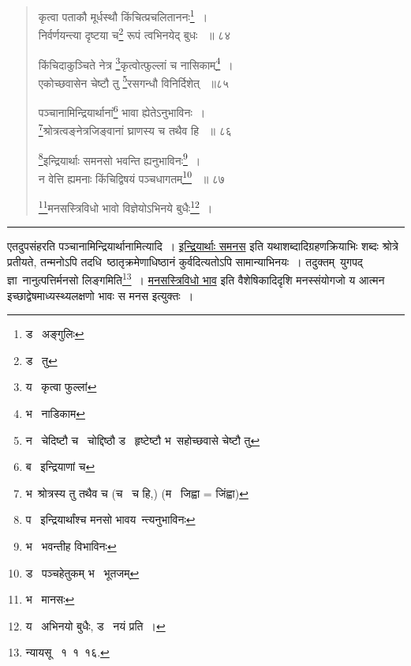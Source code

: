 \documentclass[11pt, openany]{book}
\begin{document}
{\begin{quote}
{कृत्वा पताकौ मूर्धस्थौ किंचित्प्रचलिताननः\renewcommand{\thefootnote}{2}\footnote{ड \textendash\ अङ्गुलिः}~।\\
निर्वर्णयन्त्या दृष्टया च\renewcommand{\thefootnote}{3}\footnote{ड \textendash\ तु } रूपं त्वभिनयेद् बुधः ~॥ ८४ 

किंचिदाकुञ्चिते नेत्र \renewcommand{\thefootnote}{4}\footnote{य \textendash\ कृत्वा फुल्लां}कृत्वोत्फुल्लां च नासिकाम्\renewcommand{\thefootnote}{5}\footnote{भ \textendash\ नाडिकाम }~। \\
एकोच्छवासेन चेष्टौ तु \renewcommand{\thefootnote}{6}\footnote{न \textendash\ चेदिष्टौ च \textendash\ चोद्दिष्ठौ ड \textendash\ हृष्टेष्टौ भ\textendash\ सहोच्छवासे चेष्टौ तु}रसगन्धौ विनिर्दिशेत् ~॥८५ 

पञ्चानामिन्द्रियार्थानां\renewcommand{\thefootnote}{7}\footnote{ब \textendash\ इन्द्रियाणां च} भावा ह्येतेऽनुभाविनः~।\\ 
\renewcommand{\thefootnote}{8}\footnote{भ\textendash\ श्रोत्रस्य तु तथैव च (च \textendash\ च हि,) (म \textendash\ जिह्वा = जिंह्वा) }श्रोत्रत्वङ्नेत्रजिङ्वानां घ्राणस्य च तथैव हि ~॥ ८६ 

\renewcommand{\thefootnote}{9}\footnote{प \textendash\ इन्द्रियार्थांश्च मनसो भावय\textendash\ न्त्यनुभाविनः }इन्द्रियार्थाः समनसो भवन्ति ह्यनुभाविनः\renewcommand{\thefootnote}{10}\footnote{भ \textendash\ भवन्तीह विभाविनः}~।\\ 
न वेत्ति ह्यमनाः किंचिद्विषयं पञ्चधागतम्\renewcommand{\thefootnote}{11}\footnote{ड \textendash\ पञ्चहेतुकम् भ \textendash\ भूतजम्} ~॥ ८७ 

\renewcommand{\thefootnote}{12}\footnote{भ \textendash\ मानसः }मनसस्त्रिविधो भावो विज्ञेयोऽभिनये बुधैः\renewcommand{\thefootnote}{13}\footnote{य \textendash\ अभिनयो बुधैः, ड \textendash\ नयं प्रति~। }~। }
\end{quote}

\hrule

\vspace{2mm}

\begin{sloppypar}
एतदुपसंहरति पञ्चानामिन्द्रियार्थानामित्यादि~। \underline{इन्द्रियार्थाः समनस} इति यथाशब्दादिग्रहणक्रियाभिः शब्दः श्रोत्रे प्रतीयते, तन्मनोऽपि तदधि\textendash\ ष्ठातृक्रमेणाधिष्ठानं कुर्वदित्यतोऽपि सामान्याभिनयः~। तदुक्तम्\textendash\ युगपद् ज्ञा\textendash\ नानुत्पत्तिर्मनसो लिङ्गमिति\renewcommand{\thefootnote}{*}\footnote{न्यायसू \textendash\ १\textendash\ १\textendash\ १६. }~। \underline{मनसस्त्रिविधो भाव} इति वैशेषिकादिदृशि मनस्संयोगजो य आत्मन इच्छाद्वेषमाध्यस्थ्यलक्षणो भावः स मनस इत्युक्तः~। 
\end{sloppypar}

}
\end{document}

